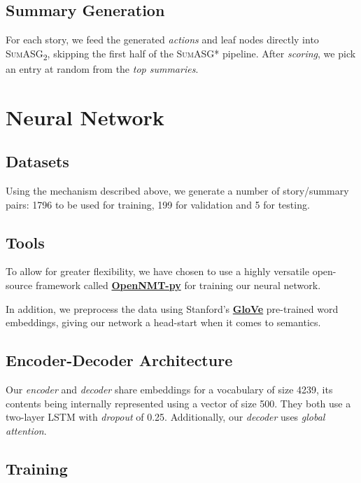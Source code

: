 \subsection{Summary Generation}

For each story, we feed the generated \textit{actions} and leaf nodes directly into \textsc{SumASG\textsubscript{2}}, skipping the first half of the \textsc{SumASG*} pipeline. After \textit{scoring}, we pick an entry at random from the \textit{top summaries}.

\section{Neural Network}

\subsection{Datasets}

Using the mechanism described above, we generate a number of story/summary pairs: 1796 to be used for training, 199 for validation and 5 for testing.

\subsection{Tools}

To allow for greater flexibility, we have chosen to use a highly versatile open-source framework called \textbf{\href{https://github.com/OpenNMT/OpenNMT-py}{OpenNMT-py}} for training our neural network.

In addition, we preprocess the data using Stanford's \textbf{\href{https://nlp.stanford.edu/projects/glove/}{GloVe}} pre-trained word embeddings, giving our network a head-start when it comes to semantics.

\subsection{Encoder-Decoder Architecture}

Our \textit{encoder} and \textit{decoder} share embeddings for a vocabulary of size 4239, its contents being internally represented using a vector of size 500. They both use a two-layer LSTM with \textit{dropout} of 0.25. Additionally, our \textit{decoder} uses \textit{global attention}.

\subsection{Training}

